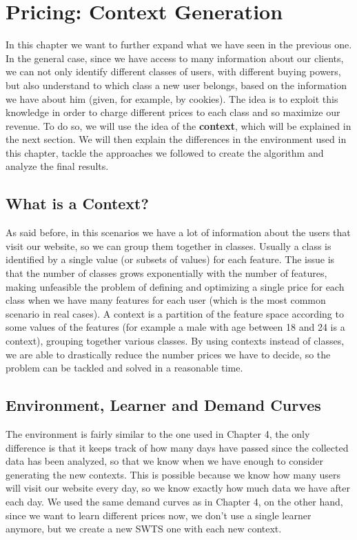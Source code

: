 \chapter{Pricing: Context Generation}\label{ch:pricing:-context-generation}

In this chapter we want to further expand what we have seen in the previous one.
In the general case, since we have access to many information about our clients, we can not only identify different classes of users, with different buying powers, but also understand to which class a new user belongs, based on the information we have about him (given, for example, by cookies).
The idea is to exploit this knowledge in order to charge different prices to each class and so maximize our revenue.
To do so, we will use the idea of the \textbf{context}, which will be explained in the next section.
We will then explain the differences in the environment used in this chapter, tackle the approaches we followed to create the algorithm and analyze the final results.


\section{What is a Context?}\label{sec:what-is-a-context?}
As said before, in this scenarios we have a lot of information about the users that visit our website, so we can group them together in classes.
Usually a class is identified by a single value (or subsets of values) for each feature.
The issue is that the number of classes grows exponentially with the number of features, making unfeasible the problem of defining and optimizing a single price for each class when we have many features for each user (which is the most common scenario in real cases).
A context is a partition of the feature space according to some values of the features (for example a male with age between 18 and 24 is a context), grouping together various classes.
By using contexts instead of classes, we are able to drastically reduce the number prices we have to decide, so the problem can be tackled and solved in a reasonable time.


\section{Environment, Learner and Demand Curves}\label{sec:environment,-learner-and-demand-curves}
The environment is fairly similar to the one used in Chapter 4, the only difference is that it keeps track of how many days have passed since the collected data has been analyzed, so that we know when we have enough to consider generating the new contexts.
This is possible because we know how many users will visit our website every day, so we know exactly how much data we have after each day.
We used the same demand curves as in Chapter 4, on the other hand, since we want to learn different prices now, we don't use a single learner anymore, but we create a new SWTS one with each new context.


